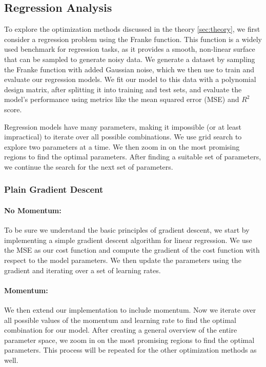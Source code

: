 
\subsection{Regression Analysis}
To explore the optimization methods discussed in the theory \cref{sec:theory}, we first consider a regression problem using the Franke function. This function is a widely used benchmark for regression tasks, as it provides a smooth, non-linear surface that can be sampled to generate noisy data. We generate a dataset by sampling the Franke function with added Gaussian noise, which we then use to train and evaluate our regression models. We fit our model to this data with a polynomial design matrix, after splitting it into training and test sets, and evaluate the model's performance using metrics like the mean squared error (MSE) and \( R^2 \) score.

Regression models have many parameters, making it impossible (or at least impractical) to iterate over all possible combinations. We use grid search to explore two parameters at a time. We then zoom in on the most promising regions to find the optimal parameters. After finding a suitable set of parameters, we continue the search for the next set of parameters.

\subsubsection{Plain Gradient Descent}
\paragraph*{No Momentum:}
To be sure we understand the basic principles of gradient descent, we start by implementing a simple gradient descent algorithm for linear regression. We use the MSE as our cost function and compute the gradient of the cost function with respect to the model parameters. We then update the parameters using the gradient and iterating over a set of learning rates.
\paragraph*{Momentum:}
We then extend our implementation to include momentum. Now we iterate over all possible values of the momentum and learning rate to find the optimal combination for our model. After creating a general overview of the entire parameter space, we zoom in on the most promising regions to find the optimal parameters. This process will be repeated for the other optimization methods as well.

